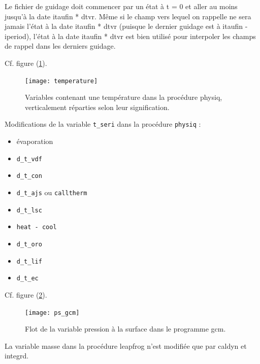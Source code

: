 \documentclass[a4paper,english,french]{article}
\begin{document}
Le fichier de guidage doit commencer par un état à t = 0 et aller au
moins jusqu'à la date itaufin * dtvr. Même si le champ vers lequel on
rappelle ne sera jamais l'état à la date itaufin * dtvr (puisque le
dernier guidage est à itaufin - iperiod), l'état à la date itaufin *
dtvr est bien utilisé pour interpoler les champs de rappel dans les
derniers guidage.

Cf. figure (\ref{fig:temperature}).
\begin{figure}
  \centering
  \texttt{[image: temperature]}
  \caption[Température dans physiq]{Variables contenant une
    température dans la procédure physiq, verticalement réparties
    selon leur signification.}
  \label{fig:temperature}
\end{figure}
Modifications de la variable \verb+t_seri+ dans la procédure
\verb+physiq+ :
\begin{itemize}
\item évaporation
\item \verb+d_t_vdf+
\item \verb+d_t_con+
\item \verb+d_t_ajs+ ou \verb+calltherm+
\item \verb+d_t_lsc+
\item \verb+heat - cool+
\item \verb+d_t_oro+
\item \verb+d_t_lif+
\item \verb+d_t_ec+
\end{itemize}

Cf. figure (\ref{fig:ps_gcm}).
\begin{figure}
  \centering
  \texttt{[image: ps\_gcm]}
  \caption[Flot de la pression à la surface dans gcm]{Flot de la
    variable pression à la surface dans le programme gcm.}
  \label{fig:ps_gcm}
\end{figure}
La variable masse dans la procédure leapfrog n'est modifiée que par
caldyn et integrd.
\end{document}
